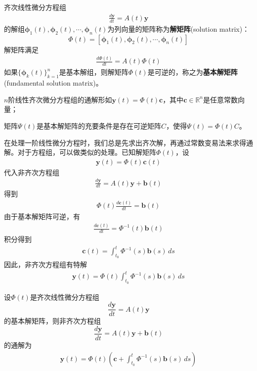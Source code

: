 \documentclass{ctexbook}
\begin{document}
\begin{definition}[解矩阵]
    齐次线性微分方程组\begin{align*}
    \frac{d\mathbf{y}}{dt}=A(t)\mathbf{y}
    \end{align*}
    的解组$\boldsymbol{\phi}_1(t),\boldsymbol{\phi}_2(t),\cdots,\boldsymbol{\phi}_n(t)$为列向量的矩阵称为\textbf{解矩阵}(solution matrix)：
    \[\Phi(t)=[\boldsymbol{\phi}_1(t),\boldsymbol{\phi}_2(t),\cdots,\boldsymbol{\phi}_n(t)]\]
    解矩阵满足\begin{align*}
        \frac{d\Phi(t)}{dt}=A(t)\Phi(t)
    \end{align*}
    如果$\{\boldsymbol{\phi}_k(t)\}_{k=1}^n$是基本解组，则解矩阵$\Phi(t)$是可逆的，称之为\textbf{基本解矩阵}(fundamental solution matrix)。
\end{definition}
\begin{proposition}
    $n$阶线性齐次微分方程组的通解形如$\mathbf{y}(t)=\Phi(t)\mathbf{c}$，其中$\mathbf{c}\in\mathbb{R}^n$是任意常数向量；

    矩阵$\Psi(t)$是基本解矩阵的充要条件是存在可逆矩阵$C$，使得$\Psi(t)=\Phi(t)C$。
\end{proposition}

在处理一阶线性微分方程时，我们总是先求出齐次解，再通过常数变易法来求得通解。对于方程组，可以做类似的处理。已知解矩阵$\Phi(t)$，设\begin{align*}
    \mathbf{y}(t)=\Phi(t)\mathbf{c}(t)
\end{align*}
代入非齐次方程组
\begin{align*}
    \frac{d\mathbf{y}}{dt}=A(t)\mathbf{y}+\mathbf{b}(t)
\end{align*}
得到
\begin{align*}
    \Phi(t)\frac{d\mathbf{c}(t)}{dt}=\mathbf{b}(t)
\end{align*}
由于基本解矩阵可逆，有
\begin{align*}
    \frac{d\mathbf{c}(t)}{dt}=\Phi^{-1}(t)\mathbf{b}(t)
\end{align*}
积分得到
\begin{align*}
    \mathbf{c}(t)=\int_{t_0}^t \Phi^{-1}(s)\mathbf{b}(s)\,ds
\end{align*}
因此，非齐次方程组有特解
\begin{align*}
    \mathbf{y}(t)=\Phi(t)\int_{t_0}^t \Phi^{-1}(s)\mathbf{b}(s)\,ds
\end{align*}
\begin{theorem}
    设$\Phi(t)$是齐次线性微分方程组
    $$\frac{d\mathbf{y}}{dt}=A(t)\mathbf{y}$$
    的基本解矩阵，则非齐次方程组
    $$\frac{d\mathbf{y}}{dt}=A(t)\mathbf{y}+\mathbf{b}(t)$$
    的通解为\begin{align*}
    \mathbf{y}(t)=\Phi(t)\left(\mathbf{c}+\int_{t_0}^t \Phi^{-1}(s)\mathbf{b}(s)\,ds\right)
    \end{align*}
\end{theorem}
\end{document}
